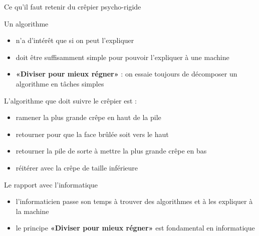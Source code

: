 \begin{frame}{Ce qu'il faut retenir du  crêpier psycho-rigide}

  \begin{block}{Un algorithme}
    \begin{itemize}
    \item n'a d'intérêt que si on peut l'expliquer
    \item doit être suffisamment simple pour pouvoir l'expliquer à une machine
    \item \alert{\textbf{«Diviser pour mieux régner»}} : on essaie toujours de décomposer un algorithme en tâches simples
    \end{itemize}
  \end{block}

  \begin{block}{L'algorithme que doit suivre le crêpier est :}
    \begin{itemize}
    \item ramener la plus grande crêpe en haut de la pile
    \item retourner pour que la face brûlée soit vers le haut
    \item retourner la pile de sorte à mettre la plus grande crêpe en bas
    \item réitérer avec la crêpe de taille inférieure
    \end{itemize}
  \end{block}

  \begin{block}{Le rapport avec l'informatique}
    \begin{itemize}
    \item l'informaticien passe son temps à trouver des algorithmes et  à les expliquer à la machine
    \item le principe \alert{\textbf{«Diviser pour mieux régner»}} est fondamental en informatique
    \end{itemize}
  \end{block}
\end{frame}

